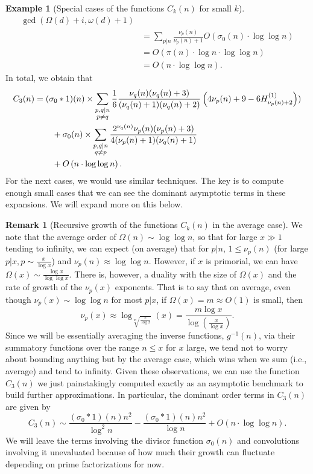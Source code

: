 \documentclass[11pt,reqno,a4letter]{article}
\numberwithin{figure}{section}
\numberwithin{table}{section}
\theoremstyle{plain}
\numberwithin{theorem}{section}
\theoremstyle{definition}
\newtheorem{example}[theorem]{Example}
\newtheorem{remark}[theorem]{Remark}
\begin{document}
\begin{example}[Special cases of the functions $C_k(n)$ for small $k$]
\begin{align*}
     \gcd\left(\Omega(d) + i, \omega(d) + 1\right) \\ 
     & = \sum_{p|n} \frac{\nu_p(n)}{\nu_p(n) + 1} O\left(\sigma_0(n) \cdot \log\log n\right) \\ 
     & = O\left(\pi(n) \cdot \log n \cdot \log\log n\right) \\ 
     & = O\left(n \cdot \log\log n\right). 
\end{align*} 
In total, we obtain that 
\begin{align} 
\label{eqn_ExactFormula_Ck3n} 
C_3(n) & = (\sigma_0 \ast 1)(n) \times \sum_{\substack{p,q|n \\ p \neq q}} 
     \frac{1}{6}\frac{\nu_q(n) (\nu_q(n) + 3)}{ 
     (\nu_q(n)+1)(\nu_q(n)+2)} \left(4\nu_p(n)+9-6 H_{\nu_p(n)+2}^{(1)}\right)) \\ 
\notag 
     & \phantom{= \quad\ } + 
     \sigma_0(n) \times \sum_{\substack{p,q|n \\ q \neq p}} 
     \frac{2^{\nu_q(n)} \nu_p(n) (\nu_p(n) + 3)}{4 (\nu_p(n) + 1) (\nu_q(n) + 1)} \\ 
\notag
     & \phantom{= \quad\ } + 
     O\left(n \cdot \log\log n\right). 
\end{align} 
For the next cases, we would use similar techniques. The key is to compute enough small cases that we can see 
the dominant asymptotic terms in these expansions. We will expand more on this below. 
\end{example}

\begin{remark}[Recursive growth of the functions $C_k(n)$ in the average case]
We note that the average order of $\Omega(n) \sim \log\log n$, so that for large $x \gg 1$ tending to 
infinity, we can expect (on average) that for $p|n$, $1 \leq \nu_p(n)$ (for large $p|x, p \sim \frac{x}{\log x}$) 
and $\nu_p(n) \approx \log\log n$. However, if $x$ is primorial, we can have 
$\Omega(x) \sim \frac{\log x}{\log\log x}$. There is, however, a duality with the size of $\Omega(x)$ and the 
rate of growth of the $\nu_p(x)$ exponents. That is to say that on average, 
even though $\nu_p(x) \sim \log\log n$ for most $p|x$, if $\Omega(x) = m \approx O(1)$ is small, then 
\[
\nu_p(x) \approx \log_{\sqrt[m]{\frac{x}{\log x}}}(x) = \frac{m \log x}{\log\left(\frac{x}{\log x}\right)}. 
\]
Since we will be essentially averaging the inverse functions, $g^{-1}(n)$, via their summatory functions 
over the range $n \leq x$ for $x$ large, we tend not to worry about bounding anything but by the 
average case, which wins when we sum (i.e., average) and tend to infinity. 
Given these observations, we can use the function $C_3(n)$ we just painstakingly computed exactly 
as an asymptotic benchmark to build further approximations. In particular, the dominant order terms in 
$C_3(n)$ are given by 
\[
C_3(n) \sim \frac{(\sigma_0 \ast 1)(n) n^2}{\log^2 n} - 
     \frac{(\sigma_0 \ast 1)(n) n^2}{\log n} + 
     O\left(n \cdot \log\log n\right). 
\]
We will leave the terms involving the divisor function $\sigma_0(n)$ and convolutions 
involving it unevaluated because of how much their growth can fluctuate depending on prime 
factorizations for now. 
\end{remark} 
\end{document}
